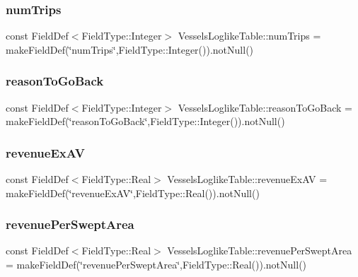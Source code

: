 \subsubsection{\texorpdfstring{numTrips}{numTrips}}
{\footnotesize\ttfamily const Field\+Def$<$Field\+Type\+::\+Integer$>$ Vessels\+Loglike\+Table\+::num\+Trips = make\+Field\+Def(\char`\"{}num\+Trips\char`\"{},Field\+Type\+::\+Integer()).not\+Null()}

\mbox{\label{class_vessels_loglike_table_aaa70ecce636b8a63366ed4c21a946212}} 
\subsubsection{\texorpdfstring{reasonToGoBack}{reasonToGoBack}}
{\footnotesize\ttfamily const Field\+Def$<$Field\+Type\+::\+Integer$>$ Vessels\+Loglike\+Table\+::reason\+To\+Go\+Back = make\+Field\+Def(\char`\"{}reason\+To\+Go\+Back\char`\"{},Field\+Type\+::\+Integer()).not\+Null()}

\mbox{\label{class_vessels_loglike_table_af94e817342da849ce231d89472985831}} 
\subsubsection{\texorpdfstring{revenueExAV}{revenueExAV}}
{\footnotesize\ttfamily const Field\+Def$<$Field\+Type\+::\+Real$>$ Vessels\+Loglike\+Table\+::revenue\+Ex\+AV = make\+Field\+Def(\char`\"{}revenue\+Ex\+AV\char`\"{},Field\+Type\+::\+Real()).not\+Null()}

\mbox{\label{class_vessels_loglike_table_a6d22995de3771d9d569ff29b4d759e41}} 
\subsubsection{\texorpdfstring{revenuePerSweptArea}{revenuePerSweptArea}}
{\footnotesize\ttfamily const Field\+Def$<$Field\+Type\+::\+Real$>$ Vessels\+Loglike\+Table\+::revenue\+Per\+Swept\+Area = make\+Field\+Def(\char`\"{}revenue\+Per\+Swept\+Area\char`\"{},Field\+Type\+::\+Real()).not\+Null()}

